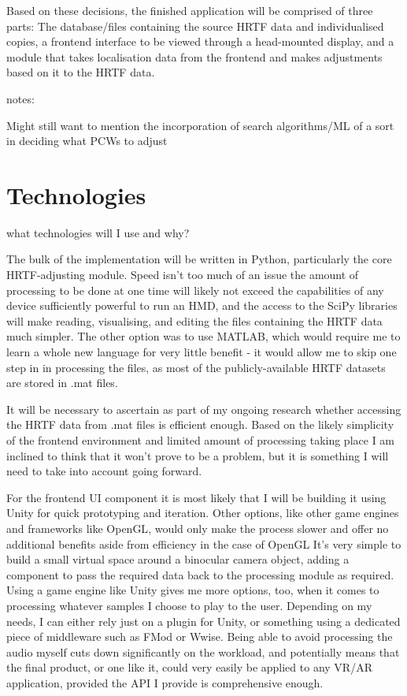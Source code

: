 \documentclass[10pt, oneside, a4paper, draft]{scrartcl}
\begin{document}
Based on these decisions, the finished application will be comprised of three parts: The database/files containing the source HRTF data and individualised copies, a frontend interface to be viewed through a head-mounted display, and a module that takes localisation data from the frontend and makes adjustments based on it to the HRTF data. 

notes: 

Might still want to mention the incorporation of search algorithms/ML of a sort in deciding what PCWs to adjust

\section*{Technologies}

what technologies will I use and why?

The bulk of the implementation will be written in Python, particularly the core HRTF-adjusting module. Speed isn't too much of an issue the amount of processing to be done at one time will likely not exceed the capabilities of any device sufficiently powerful to run an HMD, and the access to the SciPy libraries\cite{scipy website???} will make reading, visualising, and editing the files containing the HRTF data much simpler. The other option was to use MATLAB, which would require me to learn a whole new language for very little benefit - it would allow me to skip one step in in processing the files, as most of the publicly-available HRTF datasets are stored in .mat files.

It will be necessary to ascertain as part of my ongoing research whether accessing the HRTF data from .mat files is efficient enough. Based on the likely simplicity of the frontend environment and limited amount of processing taking place I am inclined to think that it won't prove to be a problem, but it is something I will need to take into account going forward. 

For the frontend UI component it is most likely that I will be building it using Unity\cite{unity??} for quick prototyping and iteration. Other options, like other game engines and frameworks like OpenGL\cite{OpenGL??}, would only make the process slower and offer no additional benefits aside from efficiency in the case of OpenGL It's very simple to build a small virtual space around a binocular camera object, adding a component to pass the required data back to the processing module as required. Using a game engine like Unity gives me more options, too, when it comes to processing whatever samples I choose to play to the user. Depending on my needs, I can either rely just on a plugin for Unity, or something using a dedicated piece of middleware such as FMod or Wwise. Being able to avoid processing the audio myself cuts down significantly on the workload, and potentially means that the final product, or one like it, could very easily be applied to any VR/AR application, provided the API I provide is comprehensive enough. 
\end{document}
